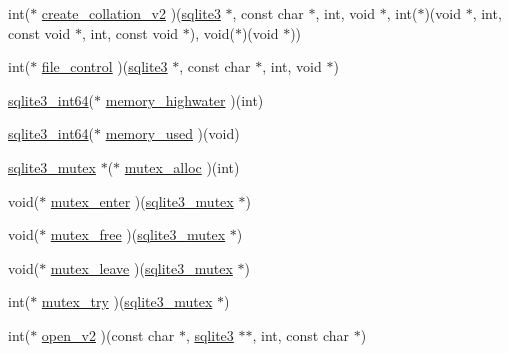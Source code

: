 \begin{DoxyCompactItemize}
\item 
int($\ast$ \hyperlink{structsqlite3__api__routines_a1e15da46f3dc62b421a8e3d84e83471c}{create\+\_\+collation\+\_\+v2} )(\hyperlink{sqlite3_8h_a0ef6f2646262c8a9b24368d8ac140f69}{sqlite3} $\ast$, const char $\ast$, int, void $\ast$, int($\ast$)(void $\ast$, int, const void $\ast$, int, const void $\ast$), void($\ast$)(void $\ast$))
\item 
int($\ast$ \hyperlink{structsqlite3__api__routines_a629c5e5c03b3223242357282c84af46d}{file\+\_\+control} )(\hyperlink{sqlite3_8h_a0ef6f2646262c8a9b24368d8ac140f69}{sqlite3} $\ast$, const char $\ast$, int, void $\ast$)
\item 
\hyperlink{sqlite3_8h_a0a4d3e6c1ad46f90e746b920ab6ca0d2}{sqlite3\+\_\+int64}($\ast$ \hyperlink{structsqlite3__api__routines_a92684afad13af8e23f02fd66ec04feba}{memory\+\_\+highwater} )(int)
\item 
\hyperlink{sqlite3_8h_a0a4d3e6c1ad46f90e746b920ab6ca0d2}{sqlite3\+\_\+int64}($\ast$ \hyperlink{structsqlite3__api__routines_ab97513cee1fdda32d881a206e6c89b4a}{memory\+\_\+used} )(void)
\item 
\hyperlink{sqlite3_8h_a0f546860bde03fddb33a9fed920da05c}{sqlite3\+\_\+mutex} $\ast$($\ast$ \hyperlink{structsqlite3__api__routines_aafca5fdf6433287ca14458b3c495d342}{mutex\+\_\+alloc} )(int)
\item 
void($\ast$ \hyperlink{structsqlite3__api__routines_afbf4a8e88080839fccf5dcd63ea2cee4}{mutex\+\_\+enter} )(\hyperlink{sqlite3_8h_a0f546860bde03fddb33a9fed920da05c}{sqlite3\+\_\+mutex} $\ast$)
\item 
void($\ast$ \hyperlink{structsqlite3__api__routines_acbc66bc0d281c1b113c455409bdce8ad}{mutex\+\_\+free} )(\hyperlink{sqlite3_8h_a0f546860bde03fddb33a9fed920da05c}{sqlite3\+\_\+mutex} $\ast$)
\item 
void($\ast$ \hyperlink{structsqlite3__api__routines_a7d02b385cc7de28a4a12cc2893d51f0a}{mutex\+\_\+leave} )(\hyperlink{sqlite3_8h_a0f546860bde03fddb33a9fed920da05c}{sqlite3\+\_\+mutex} $\ast$)
\item 
int($\ast$ \hyperlink{structsqlite3__api__routines_aa3eed04dafa14724d23f3e74a6891575}{mutex\+\_\+try} )(\hyperlink{sqlite3_8h_a0f546860bde03fddb33a9fed920da05c}{sqlite3\+\_\+mutex} $\ast$)
\item 
int($\ast$ \hyperlink{structsqlite3__api__routines_a1e6684ec7752ca3aea64da0049490083}{open\+\_\+v2} )(const char $\ast$, \hyperlink{sqlite3_8h_a0ef6f2646262c8a9b24368d8ac140f69}{sqlite3} $\ast$$\ast$, int, const char $\ast$)
\item 
$$
\end{DoxyCompactItemize}
